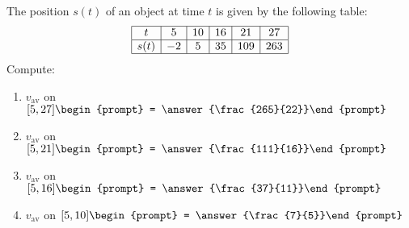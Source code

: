 \documentclass{ximera}
\author{Bart Snapp}
\begin{document}
\begin{exercise}
The position $s(t)$ of an object at time $t$ is given by the following table:
\[
\begin{array}{|c|c|c|c|c|c|}\hline
t &5 &10 &16 &21 &27 \\ \hline
s(t) &-2 &5 & 35&109 & 263\\ \hline
\end{array}
\]
Compute:
\begin{enumerate}
\item $v_{\mathrm{av}}$ on $[5,27]\begin{prompt} = \answer{\frac{265}{22}}\end{prompt}$
\item $v_{\mathrm{av}}$ on $[5,21]\begin{prompt} = \answer{\frac{111}{16}}\end{prompt}$
\item $v_{\mathrm{av}}$ on $[5,16]\begin{prompt} = \answer{\frac{37}{11}}\end{prompt}$
\item $v_{\mathrm{av}}$ on $[5,10]\begin{prompt} = \answer{\frac{7}{5}}\end{prompt}$
\end{enumerate}
\end{exercise}
\end{document}

